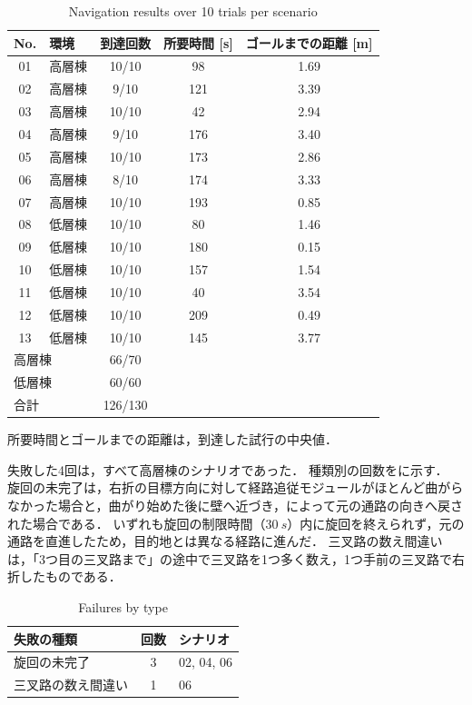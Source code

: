 \begin{table}[tb]
  \centering
  \caption{Navigation results over 10 trials per scenario}
  \label{tab:result}
  \begin{tabular}{clccc}
    \toprule
    No. & 環境 & 到達回数 & 所要時間 [s] & ゴールまでの距離 [m] \\
    \midrule
    01 & 高層棟 & 10/10 &  98 & 1.69 \\
    02 & 高層棟 &  9/10 & 121 & 3.39 \\
    03 & 高層棟 & 10/10 &  42 & 2.94 \\
    04 & 高層棟 &  9/10 & 176 & 3.40 \\
    05 & 高層棟 & 10/10 & 173 & 2.86 \\
    06 & 高層棟 &  8/10 & 174 & 3.33 \\
    07 & 高層棟 & 10/10 & 193 & 0.85 \\
    08 & 低層棟 & 10/10 &  80 & 1.46 \\
    09 & 低層棟 & 10/10 & 180 & 0.15 \\
    10 & 低層棟 & 10/10 & 157 & 1.54 \\
    11 & 低層棟 & 10/10 &  40 & 3.54 \\
    12 & 低層棟 & 10/10 & 209 & 0.49 \\
    13 & 低層棟 & 10/10 & 145 & 3.77 \\
    \midrule
    \multicolumn{2}{l}{高層棟} & 66/70 & & \\
    \multicolumn{2}{l}{低層棟} & 60/60 & & \\
    \multicolumn{2}{l}{合計}   & 126/130 & & \\
    \bottomrule
  \end{tabular}
  \par\smallskip
  {\footnotesize 所要時間とゴールまでの距離は，到達した試行の中央値．}
\end{table}

失敗した4回は，すべて高層棟のシナリオであった．
種類別の回数をに示す．
旋回の未完了は，右折の目標方向に対して経路追従モジュールがほとんど曲がらなかった場合と，曲がり始めた後に壁へ近づき，\CARE によって元の通路の向きへ戻された場合である．
いずれも旋回の制限時間（$\SI{30}{s}$）内に旋回を終えられず，元の通路を直進したため，目的地とは異なる経路に進んだ．
三叉路の数え間違いは，「3つ目の三叉路まで」の途中で三叉路を1つ多く数え，1つ手前の三叉路で右折したものである．

\begin{table}[tb]
  \centering
  \caption{Failures by type}
  \label{tab:failure}
  \begin{tabular}{lcl}
    \toprule
    失敗の種類 & 回数 & シナリオ \\
    \midrule
    旋回の未完了 & 3 & 02, 04, 06 \\
    三叉路の数え間違い & 1 & 06 \\
    \bottomrule
  \end{tabular}
\end{table}


